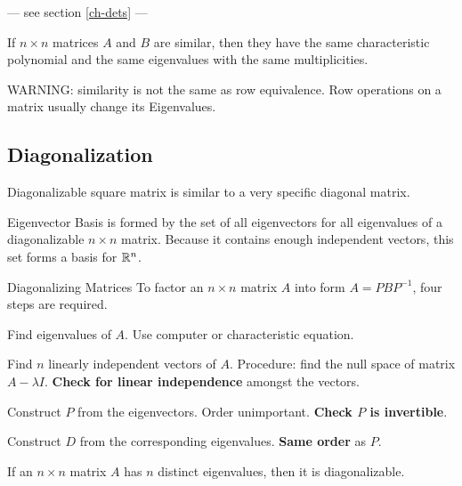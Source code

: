 \begin{card}
    \begin{theorem}
    --- see section \ref{ch-dets} ---
    \end{theorem}

    \begin{theorem}
    If $n \times n$ matrices $A$ and $B$ are similar, then they have the same
    characteristic polynomial and the same eigenvalues with the same
    multiplicities.
    \end{theorem}

    WARNING: similarity is not the same as row equivalence. Row operations on
    a matrix usually change its Eigenvalues.

\end{card}


\begin{card}
    \subsection{Diagonalization}

    \begin{compactdesc}
    \item[Diagonalizable] square matrix is similar to a very specific
        diagonal matrix.
    \item[Eigenvector Basis] is formed by the set of all eigenvectors for
        all eigenvalues of a diagonalizable $n \times n$ matrix.
        Because it contains enough independent vectors,
        this set forms a basis for $\mathbb{R}^n$.
    \item[Diagonalizing Matrices] To factor an $n \times n$ matrix $A$ into
        form $A = PBP^{-1}$, four steps are required.
    \begin{compactenum}
    \item Find eigenvalues of $A$. Use computer or characteristic equation.
    \item Find $n$ linearly independent vectors of $A$.
        Procedure: find the null space of matrix $A - \lambda I$.
        \textbf{Check for linear independence} amongst the vectors.
    \item Construct $P$ from the eigenvectors. Order unimportant.
        \textbf{Check $P$ is invertible}.
    \item Construct $D$ from the corresponding eigenvalues.
        \textbf{Same order} as $P$.
    \end{compactenum}
    \end{compactdesc}


    \begin{theorem}
    If an $n \times n$ matrix $A$ has $n$ distinct eigenvalues,
    then it is diagonalizable.
    \end{theorem}

\end{card}
